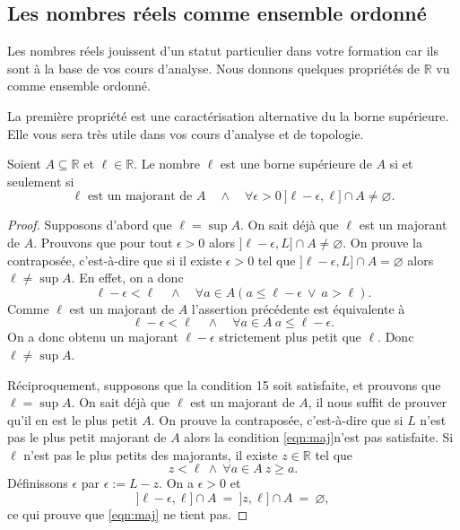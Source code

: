 \documentclass[french,course,oneside,theoremnosection]{lecture}
\newcommand{\R}{\mathbb{R}}
\begin{document}
\subsection{Les nombres réels comme ensemble ordonné}
Les nombres réels jouissent d'un statut particulier dans votre formation car ils sont à la base de vos cours d'analyse. Nous donnons quelques propriétés de $\R$ vu comme ensemble ordonné.

La première propriété est une caractérisation alternative du la borne supérieure. Elle vous sera très utile dans vos cours d'analyse et de topologie.
\begin{proposition}
Soient $A\subseteq \R$ et $\ell \in \R$. Le nombre $\ell$ est une borne supérieure de $A$ si et seulement si
\begin{equation}\label{eqn:maj}
\ell \text{ est un majorant de } A \quad \wedge \quad \forall \epsilon >0\ ]\ell-\epsilon, \ell]\cap A \neq \varnothing.
\end{equation}
\end{proposition}
\begin{proof}
Supposons d'abord que $\ell = \sup A$. On sait déjà que $\ell$ est un majorant de $A$. Prouvons que pour tout $\epsilon >0$ alors $]\ell-\epsilon, L]\cap A \neq \varnothing$. On prouve la contraposée, c'est-à-dire que si il existe $\epsilon >0$ tel que $]\ell-\epsilon, L]\cap A = \varnothing$ alors $\ell\neq \sup A$. En effet, on a donc
\[
\ell - \epsilon < \ell \quad \wedge \quad \forall a\in A (a\leq \ell-\epsilon \ \vee\  a>\ell).
\]
Comme $\ell$ est un majorant de $A$ l'assertion précédente est équivalente à 
\[
\ell - \epsilon < \ell \quad \wedge \quad \forall a\in A \ a\leq \ell-\epsilon.
\]
On a donc obtenu un majorant $\ell-\epsilon$ strictement plus petit que $\ell$. Donc $\ell \neq \sup A$.

Réciproquement, supposons que la condition 15 soit satisfaite, et prouvons que $\ell=\sup A$. On sait déjà que $\ell$ est un majorant de $A$, il nous suffit de prouver qu'il en est le plus petit $A$. On prouve la contraposée, c'est-à-dire que si $L$ n'est pas le plus petit majorant de $A$ alors la condition \eqref{eqn:maj}n'est pas satisfaite. Si $\ell$ n'est pas le plus petits des majorants, il existe $z\in \R$ tel que
\[
z<\ell \ \wedge \ \forall a\in A \ z\geq a.
\]
Définissons $\epsilon$ par $\epsilon:=L-z$.  On a $\epsilon >0$ et
 \[
 ]\ell-\epsilon, \ell] \cap A \ = \ ]z,\ell]\cap A\ = \ \varnothing,
 \]
 ce qui prouve que \eqref{eqn:maj} ne tient pas.
\end{proof}
\end{document}
